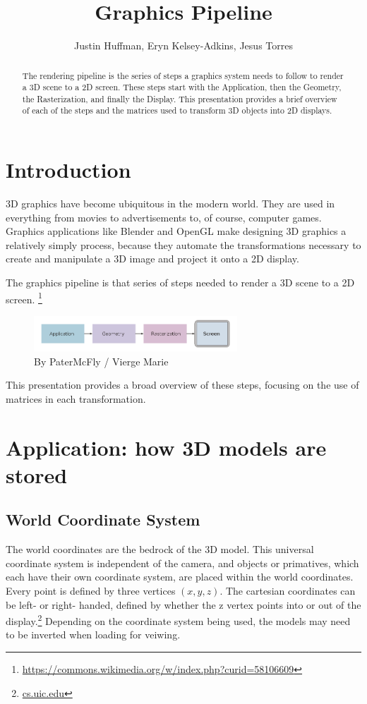 \documentclass{article}
\begin{document}
\title{Graphics Pipeline}
\author{Justin Huffman, Eryn Kelsey-Adkins, Jesus Torres}

\maketitle

\begin{abstract}
The rendering pipeline is the series of steps a graphics system needs to follow to render a 3D scene to a 2D screen. These steps start with the Application, then the Geometry, the Rasterization, and finally the Display. This presentation provides a brief overview of each of the steps and the matrices used to transform 3D objects into 2D displays.
\end{abstract}

\section{Introduction}
3D graphics have become ubiquitous in the modern world. They are used in everything from movies to advertisements to, of course, computer games. Graphics applications like Blender and OpenGL make designing 3D graphics a relatively simply process, because they automate the transformations necessary to create and manipulate a 3D image and project it onto a 2D display.


The graphics pipeline is that series of steps needed to render a 3D scene to a 2D screen. \footnote{\url{https://commons.wikimedia.org/w/index.php?curid=58106609}}

\begin{figure}[H]
    \centering
    \includegraphics[width=3.0in]{Graphics_pipeline_2_en.png}
    \caption{By PaterMcFly / Vierge Marie}
    \label{pipeline}
\end{figure} 

This presentation provides a broad overview of these steps, focusing on the use of matrices in each transformation.

\section{Application: how 3D models are stored}

\subsection{World Coordinate System}
The world coordinates are the bedrock of the 3D model. This universal coordinate system is independent of the camera, and objects or primatives, which each have their own coordinate system, are placed within the world coordinates. Every point is defined by three vertices $(x, y, z)$. The cartesian coordinates can be left- or right- handed, defined by whether the z vertex points into or out of the display.\footnote{\url{cs.uic.edu}} Depending on the coordinate system being used, the models may need to be inverted when loading for veiwing.
\end{document}
